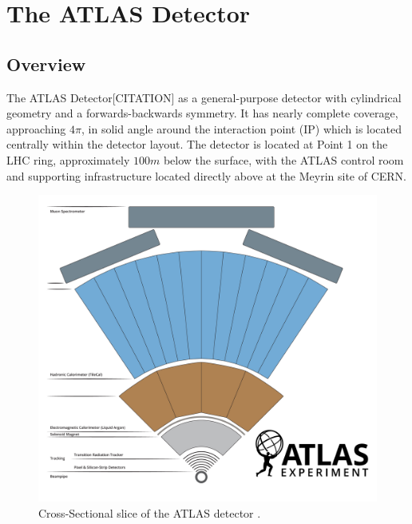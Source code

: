 \section{The ATLAS Detector}
\subsection{Overview}
The ATLAS Detector[CITATION] as a general-purpose detector with cylindrical geometry and a forwards-backwards symmetry. It has nearly complete coverage, approaching $4\pi$, in solid angle around the interaction point (IP) which is located centrally within the detector layout. The detector is located at Point 1 on the LHC ring, approximately $100m$ below the surface, with the ATLAS control room and supporting infrastructure located directly above at the Meyrin site of CERN.
\begin{figure}[!h]
    \centering
    \includegraphics[width=\textwidth]{figures/lhc_and_atlas/ATLAS_DET_SLICE.png}
    \caption{Cross-Sectional slice of the ATLAS detector \cite{Mehlhase:2770815}. }
    \label{fig:detslice}
\end{figure}
